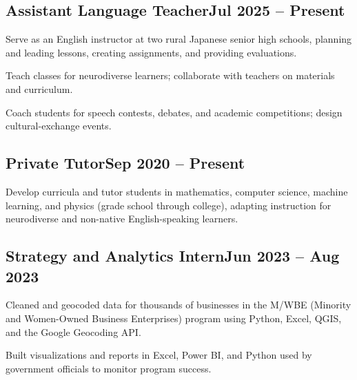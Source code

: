 \documentclass[letter,10pt]{article}
\begin{document}
\subsection{{Assistant Language Teacher}\hfill Jul 2025 -- Present}
\begin{zitemize}
\item Serve as an English instructor at two rural Japanese senior high schools, planning and leading lessons, creating assignments, and providing evaluations.
\item Teach classes for neurodiverse learners; collaborate with teachers on materials and curriculum.
\item Coach students for speech contests, debates, and academic competitions; design cultural-exchange events.
\end{zitemize}

\vspace*{\entrygap}
\subsection{{Private Tutor}\hfill Sep 2020 -- Present}
\begin{zitemize}
\item Develop curricula and tutor students in mathematics, computer science, machine learning, and physics (grade school through college), adapting instruction for neurodiverse and non-native English-speaking learners.
\end{zitemize}

\vspace*{\entrygap}
\subsection{{Strategy and Analytics Intern}\hfill Jun 2023 -- Aug 2023}
\begin{zitemize}
\item Cleaned and geocoded data for thousands of businesses in the M/WBE (Minority and Women-Owned Business Enterprises) program using Python, Excel, QGIS, and the Google Geocoding API.
\item Built visualizations and reports in Excel, Power BI, and Python used by government officials to monitor program success.
\end{zitemize}
\end{document}

